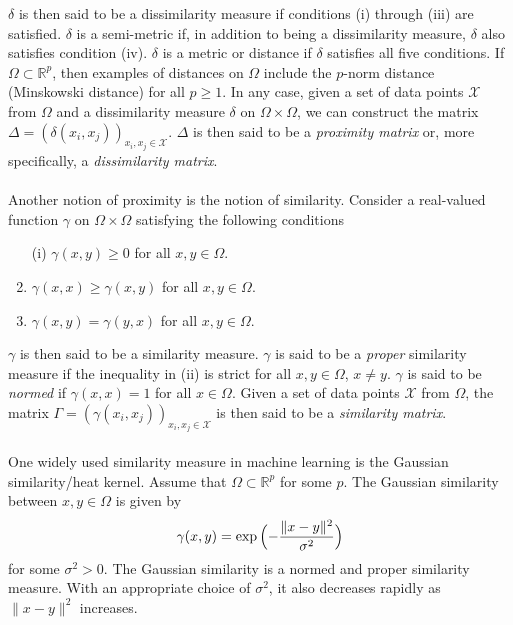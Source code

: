 $\delta$ is then said to be a dissimilarity measure if conditions (i)
through (iii) are satisfied. $\delta$ is a semi-metric if, in addition
to being a dissimilarity measure, $\delta$ also satisfies condition
(iv). $\delta$ is a metric or distance if $\delta$ satisfies all five
conditions. If $\Omega \subset \mathbb{R}^{p}$, then examples of
distances on $\Omega$ include the $p$-norm distance (Minskowski
distance) for all $p \geq 1$. In any case, given a set of data points
$\mathcal{X}$ from $\Omega$ and a dissimilarity measure $\delta$ on
$\Omega \times \Omega$, we can construct the matrix $\Delta =
(\delta(x_i,x_j))_{x_i,x_j \in \mathcal{X}}$. $\Delta$ is then said to
be a \emph{proximity matrix} or, more specifically, a \emph{dissimilarity
  matrix}. \\ \\
%
%
\noindent
Another notion of proximity is the notion of similarity. Consider a
real-valued function $\gamma$ on $\Omega \times \Omega$ satisfying the
following conditions
\begin{enumerate}
\item[(i)] $\gamma(x,y) \geq 0$ for all $x,y \in \Omega$.
\item $\gamma(x,x) \geq \gamma(x,y)$ for all $x,y \in \Omega$.
\item $\gamma(x,y) = \gamma(y,x)$ for all $x,y \in \Omega$.
\end{enumerate}
$\gamma$ is then said to be a similarity measure. $\gamma$ is said to
be a \emph{proper} similarity measure if the inequality in (ii) is strict for
all $x,y \in \Omega$, $x \not = y$. $\gamma$ is said to be
\emph{normed} if $\gamma(x,x) = 1$ for all $x \in \Omega$. Given a set
of data points $\mathcal{X}$ from $\Omega$, the matrix $\Gamma =
(\gamma(x_i,x_j))_{x_i,x_j \in \mathcal{X}}$ is then said to be a
\emph{similarity matrix}. \\ \\
%
%
\noindent One widely used similarity measure in machine learning is the Gaussian
similarity/heat kernel. Assume that $\Omega \subset \mathbb{R}^{p}$
for some $p$. The Gaussian similarity between $x,y \in \Omega$ is
given by
\begin{equation}
  \label{eq:100}
  \gamma(x,y) = \exp{\Bigl(-\frac{\|x - y\|^{2}}{\sigma^2}\Bigr)}
\end{equation}
for some $\sigma^2 > 0$. The Gaussian similarity is a normed and
proper similarity measure. With an appropriate choice of $\sigma^2$,
it also decreases rapidly as $\|x - y\|^2$ increases. \\ \\
